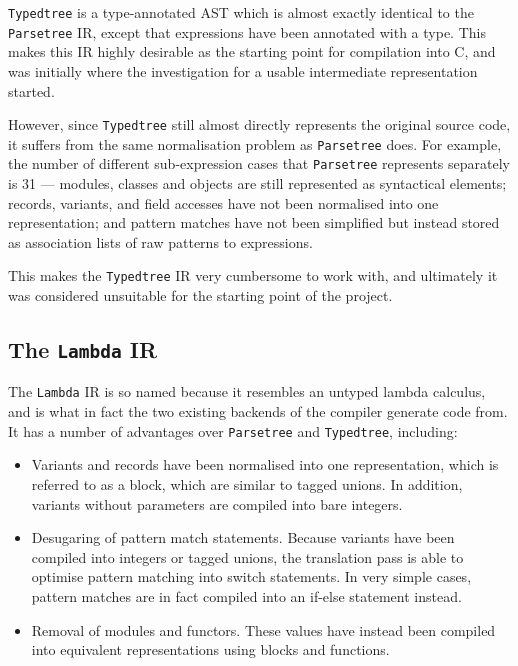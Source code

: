 \documentclass[12pt,a4paper,twoside,openright]{report}
\begin{document}
\texttt{Typedtree} is a type-annotated AST which is almost exactly identical to 
the \texttt{Parsetree} IR, except that expressions have been annotated with a 
type. This makes this IR highly desirable as the starting point for compilation 
into C, and was initially where the investigation for a usable intermediate 
representation started.

However, since \texttt{Typedtree} still almost directly represents the original
source code, it suffers from the same normalisation problem as
\texttt{Parsetree} does. For example, the number of different sub-expression
cases that \texttt{Parsetree} represents separately is 31 --- modules, classes
and objects are still represented as syntactical elements; records, variants,
and field accesses have not been normalised into one representation; and pattern
matches have not been simplified but instead stored as association lists of raw
patterns to expressions.

This makes the \texttt{Typedtree} IR very cumbersome to work with, and 
ultimately it was considered unsuitable for the starting point of the project.

\subsection{The \texttt{Lambda} IR}

The \texttt{Lambda} IR is so named because it resembles an untyped lambda 
calculus, and is what in fact the two existing backends of the compiler 
generate code from. It has a number of advantages over \texttt{Parsetree} and 
\texttt{Typedtree}, including:

\begin{itemize}

\item Variants and records have been normalised into one representation, which
    is referred to as a block, which are similar to tagged unions. In addition,
    variants without parameters are compiled into bare integers.

\item Desugaring of pattern match statements. Because variants have been
    compiled into integers or tagged unions, the translation pass is able to
    optimise pattern matching into switch statements. In very simple cases,
    pattern matches are in fact compiled into an if-else statement instead.

\item Removal of modules and functors. These values have instead been compiled
    into equivalent representations using blocks and functions.

\end{itemize}
\end{document}
